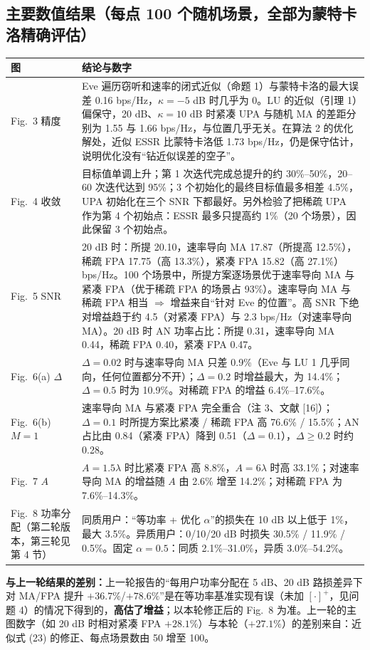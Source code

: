 \documentclass[11pt,a4paper]{ctexart}
\begin{document}
\subsection{主要数值结果（每点 100 个随机场景，全部为蒙特卡洛精确评估）}
\begin{longtable}{p{2.6cm}p{13.1cm}}
\toprule
图 & 结论与数字 \\ \midrule
Fig.~3 精度 & Eve 遍历窃听和速率的闭式近似（命题 1）与蒙特卡洛的最大误差 0.16 bps/Hz，$\kappa=-5$ dB 时几乎为 0。LU 的近似（引理 1）偏保守，20 dB、$\kappa=10$ dB 时紧凑 UPA 与随机 MA 的差距分别为 1.55 与 1.66 bps/Hz，与位置几乎无关。在算法 2 的优化解处，近似 ESSR 比蒙特卡洛低 1.73 bps/Hz，仍是保守估计，说明优化没有“钻近似误差的空子”。\\
Fig.~4 收敛 & 目标值单调上升；第 1 次迭代完成总提升的约 30\%--50\%，20--60 次迭代达到 95\%；3 个初始化的最终目标值最多相差 4.5\%，UPA 初始化在三个 SNR 下都最好。另外检验了把稀疏 UPA 作为第 4 个初始点：ESSR 最多只提高约 1\%（20 个场景），因此保留 3 个初始点。\\
Fig.~5 SNR & 20 dB 时：所提 20.10，速率导向 MA 17.87（所提高 12.5\%），稀疏 FPA 17.75（高 13.3\%），紧凑 FPA 15.82（高 27.1\%）bps/Hz。100 个场景中，所提方案逐场景优于速率导向 MA 与紧凑 FPA（优于稀疏 FPA 的场景占 93\%）。速率导向 MA 与稀疏 FPA 相当 $\Rightarrow$ 增益来自“针对 Eve 的位置”。高 SNR 下绝对增益趋于约 4.5（对紧凑 FPA）与 2.3 bps/Hz（对速率导向 MA）。20 dB 时 AN 功率占比：所提 0.31，速率导向 MA 0.44，稀疏 FPA 0.40，紧凑 FPA 0.47。\\
Fig.~6(a) $\Delta$ & $\Delta=0.02$ 时与速率导向 MA 只差 0.9\%（Eve 与 LU 1 几乎同向，任何位置都分不开）；$\Delta=0.2$ 时增益最大，为 14.4\%；$\Delta=0.5$ 时为 10.9\%。对稀疏 FPA 的增益 6.4\%--17.6\%。\\
Fig.~6(b) $M=1$ & 速率导向 MA 与紧凑 FPA 完全重合（注 3、文献 [16]）；$\Delta=0.1$ 时所提方案比紧凑 / 稀疏 FPA 高 76.6\% / 15.5\%；AN 占比由 0.84（紧凑 FPA）降到 0.51（$\Delta=0.1$），$\Delta\ge0.2$ 时约 0.28。\\
Fig.~7 $A$ & $A=1.5\lambda$ 时比紧凑 FPA 高 8.8\%，$A=6\lambda$ 时高 33.1\%；对速率导向 MA 的增益随 $A$ 由 2.6\% 增至 14.2\%；对稀疏 FPA 为 7.6\%--14.3\%。\\
Fig.~8 功率分配（第二轮版本，第三轮见第 4 节） & 同质用户：“等功率 + 优化 $\alpha$”的损失在 10 dB 以上低于 1\%，最大 3.5\%。异质用户：0/10/20 dB 时损失 30.5\% / 11.9\% / 0.5\%。固定 $\alpha=0.5$：同质 2.1\%--31.0\%，异质 3.0\%--54.2\%。\\
\bottomrule
\end{longtable}
\textbf{与上一轮结果的差别：}上一轮报告的“每用户功率分配在 5 dB、20 dB 路损差异下对 MA/FPA 提升 $+36.7\%$/$+78.6\%$”是在等功率基准实现有误（未加 $[\cdot]^+$，见问题 4）的情况下得到的，\textbf{高估了增益}；以本轮修正后的 Fig.~8 为准。上一轮的主图数字（如 20 dB 时相对紧凑 FPA $+28.1\%$）与本轮（$+27.1\%$）的差别来自：近似式 (23) 的修正、每点场景数由 50 增至 100。
\end{document}
